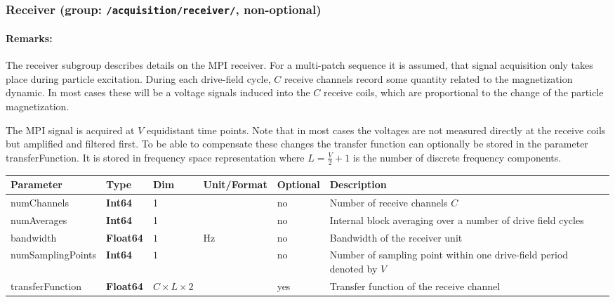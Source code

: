 \documentclass[landscape,a4paper]{article} %
\newcommand{\inl}[1]{\lstinline[columns=fixed]{#1}}
\newcommand{\inltab}[1]{{\ttfamily\bfseries\color{blue}#1}}
\newcommand{\inlvar}[1]{{\ttfamily#1}}
\begin{document}
\subsubsection{Receiver (group: \inl{/acquisition/receiver/}, non-optional)}

\begin{multicols}{2}
\paragraph{Remarks:} The receiver subgroup describes details on the MPI receiver. For a multi-patch sequence it is assumed, that signal acquisition only takes place during particle excitation. During each drive-field cycle, $C$ receive channels record some quantity related to the magnetization dynamic. In most cases these will be a voltage signals induced into the $C$ receive coils, which are proportional to the change of the particle magnetization. 

The MPI signal is acquired at $V$ equidistant time points. Note that in most cases the voltages are not measured directly at the receive coils but amplified and filtered first. To be able to compensate these changes the transfer function can optionally be stored in the parameter \inlvar{transferFunction}. It is stored in frequency space representation where $L=\frac{V}{2}+1$ is the number of discrete frequency components.
\end{multicols}

\noindent \begin{tabularx}{\columnwidth}{lllllX} 
\textbf{Parameter} & \textbf{Type} & \textbf{Dim} & \textbf{Unit/Format} & \textbf{Optional} & \textbf{Description} \\ \hline 
\inlvar{numChannels} & \inltab{Int64} & 1 & & no & Number of receive channels $C$ \\ \hline 
\inlvar{numAverages} & \inltab{Int64} & 1 & & no & Internal block averaging over a number of drive field cycles \\ \hline 
\inlvar{bandwidth} & \inltab{Float64} & $1$ & Hz & no & Bandwidth of the receiver unit \\ \hline
\inlvar{numSamplingPoints} & \inltab{Int64} & $1$ &  & no & Number of sampling point within one drive-field period denoted by $V$ \\ \hline
\inlvar{transferFunction} & \inltab{Float64} & $C \times L \times 2$ &  & yes & Transfer function of the receive channel \\ \hline
\end{tabularx}
\end{document}
